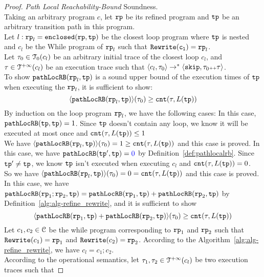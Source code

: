 \begin{proof}
\emph{Path Local Reachability-Bound} Soundness.
\\
Taking an arbitrary program $c$, let $\mathtt{rp}$ be its refined program and $\mathtt{tp}$ be an arbitrary transition path in this program.
\\
Let $l: \mathtt{rp}_l = \mathtt{enclosed}(\mathtt{rp}, \mathtt{tp})$ be the closest loop program where $\mathtt{tp}$ is nested and $c_l$ be the While program of $\mathtt{rp}_l$ such that $\mathtt{Rewrite(c_l)} = \mathtt{rp}_l$. 
\\
Let $\mathtt{\tau}_0 \in \mathcal{T}_0(c_l)$ be an arbitrary initial trace of the closest loop $c_l$, and $\mathtt{\tau} \in \mathcal{T}^{+\infty}(c_l)$ be an execution trace such that $\langle c_l, \mathtt{\tau}_0 \rangle \to^* \langle \mathtt{skip}, \mathtt{\tau}_0 {\scriptscriptstyle ++} \mathtt{\tau} \rangle$.
\\
To show $\mathtt{pathLocRB}(\mathtt{rp}_l, \mathtt{tp})$ is a sound upper bound of the execution times of $\mathtt{tp}$ when executing the $\mathtt{rp}_l$, it is sufficient to show:
\[
  \langle \mathtt{pathLocRB}(\mathtt{rp}_l, \mathtt{tp}) \rangle(\mathtt{\tau}_0) \geq \mathtt{cnt}(\mathtt{\tau}, L(\mathtt{tp}))
  \]
By induction on the loop program $\mathtt{rp}_l$,
we have the following cases:
In this case, $\mathtt{pathLocRB}(\mathtt{tp}, \mathtt{tp}) = 1$. 
Since $\mathtt{tp}$ doesn't contain any loop, we know it will be executed at most once and $\mathtt{cnt}(\mathtt{\tau}, L(\mathtt{tp})) \leq 1$
\\
We have $\langle \mathtt{pathLocRB}(\mathtt{rp}_l, \mathtt{tp}) \rangle(\mathtt{\tau}_0) = 1 \geq \mathtt{cnt}(\mathtt{\tau}, L(\mathtt{tp})) $ and this case is proved.
In this case, we have $\outinB(\tpath', \tpath) = \highlight{0} $ by Definition~\ref{def:pathlocalrb}.
Since $\mathtt{tp}' \neq \mathtt{tp}$, we know $\mathtt{tp}$ isn't executed when executing $c_l$ and $\mathtt{cnt}(\mathtt{\tau}, L(\mathtt{tp})) = 0$.
\\
So we have $\langle \mathtt{pathLocRB}(\mathtt{rp}_l, \mathtt{tp}) \rangle(\mathtt{\tau}_0) = 0 = \mathtt{cnt}(\mathtt{\tau}, L(\mathtt{tp})) $ and this case is proved.
In this case, we have $\mathtt{pathLocRB}(\mathtt{rp}_1;\mathtt{rp}_2, \mathtt{tp}) = \mathtt{pathLocRB}(\mathtt{rp}_1, \mathtt{tp}) + \mathtt{pathLocRB}(\mathtt{rp}_2, \mathtt{tp}) $ by Definition~\ref{alg:alg-refine_rewrite}, and
it is sufficient to show
\[
  \langle \mathtt{pathLocRB}(\mathtt{rp}_1, \mathtt{tp}) + \mathtt{pathLocRB}(\mathtt{rp}_2, \mathtt{tp}) \rangle(\mathtt{\tau}_0) \geq \mathtt{cnt}(\mathtt{\tau}, L(\mathtt{tp})) 
\]
Let $c_1, c_2 \in \mathcal{C}$ be the while program corresponding to $\mathtt{rp}_1$ and $\mathtt{rp}_2$ such that $\mathtt{Rewrite}(c_1) = \mathtt{rp}_1$ and $\mathtt{Rewrite}(c_2) = \mathtt{rp}_2$.
According to the Algorithm~\ref{alg:alg-refine_rewrite}, we have $c_l = c_1; c_2$.
\\
According to the operational semantics, let $\mathtt{\tau}_1, \mathtt{\tau}_2 \in \mathcal{T}^{+\infty}(c_l)$ be two execution traces such that 

\end{proof}
